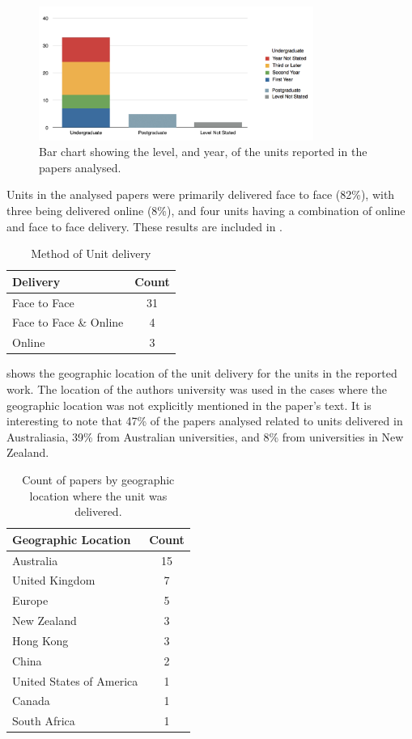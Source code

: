 \begin{figure}[htbp]
	\centering
	\includegraphics[width=0.8\textwidth]{LevelAndYear}
	\caption{Bar chart showing the level, and year, of the units reported in the papers analysed.}
	\label{fig:year_level}
\end{figure}

Units in the analysed papers were primarily delivered face to face (82\%), with three being delivered online (8\%), and four units having a combination of online and face to face delivery. These results are included in .

\begin{table}[htbp]
	\centering
	\caption{Method of Unit delivery}
	\label{tbl:delivery}
	\footnotesize
    \begin{tabular}{l|c}
    \textbf{Delivery} & \textbf{Count} \\ \hline
    Face to Face & 31 \\
    Face to Face \& Online & 4 \\
    Online & 3 \\
    \end{tabular}
\end{table}

 shows the geographic location of the unit delivery for the units in the reported work. The location of the authors university was used in the cases where the geographic location was not explicitly mentioned in the paper's text. It is interesting to note that 47\% of the papers analysed related to units delivered in Australiasia, 39\% from Australian universities, and 8\% from universities in New Zealand. 

\begin{table}[htbp]
	\centering
	\caption{Count of papers by geographic location where the unit was delivered.}
	\label{tbl:location}
	\footnotesize
    \begin{tabular}{lc}
    \textbf{Geographic Location} & \textbf{Count} \\ \hline
		Australia	 & 15 \\
		United Kingdom & 	7 \\
		Europe & 	5 \\
		New Zealand & 	3 \\
		Hong Kong & 	3 \\
		China & 	2 \\
		United States of America & 	1 \\
		Canada & 	1 \\
		South Africa & 	1 \\
    \end{tabular}
\end{table}

